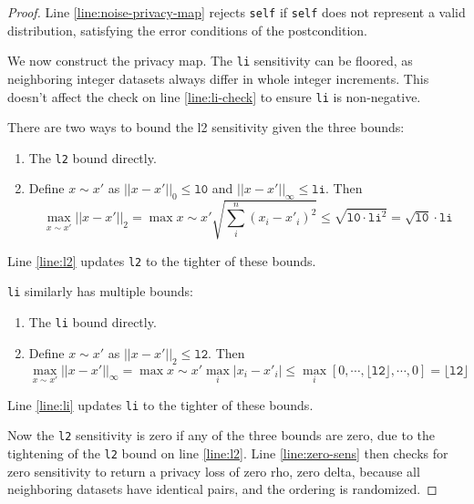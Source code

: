 \documentclass{article}
\begin{document}
\begin{proof}
    Line \ref{line:noise-privacy-map} rejects \texttt{self} if \texttt{self} does not represent a valid distribution,
    satisfying the error conditions of the postcondition.

    We now construct the privacy map.
    The \texttt{li} sensitivity can be floored, 
    as neighboring integer datasets always differ in whole integer increments.
    This doesn't affect the check on line \ref{line:li-check} to ensure \texttt{li} is non-negative.
    
    There are two ways to bound the l2 sensitivity given the three bounds:
    \begin{enumerate}
        \item The \texttt{l2} bound directly.
        \item Define $x \sim x'$ as $||x - x'||_0 \leq \texttt{l0}$ and $||x - x'||_\infty \leq \texttt{li}$. Then
        \begin{equation}
            \max_{x \sim x'} ||x - x'||_2 = \max{x \sim x'} \sqrt{\sum^n_i (x_i - x'_i)^2} \leq \sqrt{\texttt{l0} \cdot \texttt{li}^2} = \sqrt{\texttt{l0}} \cdot \texttt{li}
        \end{equation}
    \end{enumerate}
    Line \ref{line:l2} updates \texttt{l2} to the tighter of these bounds.

    \texttt{li} similarly has multiple bounds:
    \begin{enumerate}
        \item The \texttt{li} bound directly.
        \item Define $x \sim x'$ as $||x - x'||_2 \leq \texttt{l2}$. Then
        \begin{equation}
            \max_{x \sim x'} ||x - x'||_\infty = \max{x \sim x'} \max_i |x_i - x'_i| \leq \max_i [0, \cdots, \lfloor\texttt{l2}\rfloor, \cdots, 0] = \lfloor\texttt{l2}\rfloor
        \end{equation}
    \end{enumerate}
    Line \ref{line:li} updates \texttt{li} to the tighter of these bounds.

    Now the \texttt{l2} sensitivity is zero if any of the three bounds are zero,
    due to the tightening of the \texttt{l2} bound on line \ref{line:l2}.
    Line \ref{line:zero-sens} then checks for zero sensitivity to return a privacy loss of zero rho, zero delta, 
    because all neighboring datasets have identical pairs, and the ordering is randomized.


\end{proof}
\end{document}
